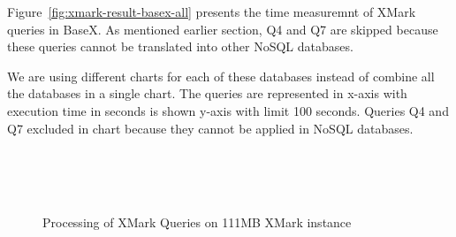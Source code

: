 Figure~\ref{fig:xmark-result-basex-all} presents the time measuremnt of  XMark queries in BaseX. As mentioned earlier section, Q4 and Q7 are skipped because these queries cannot be translated into other NoSQL databases.  
	
We are using different charts for each of these databases instead of combine all the databases in a single chart. The queries are represented in x-axis with execution time in seconds is shown y-axis with limit 100 seconds. Queries Q4 and Q7 excluded in chart because they cannot be applied in NoSQL databases.


\begin{figure}[H]
	\centering
	\\
	
	\centering
	\\
	
	\centering
	\\
	
	\centering
	
	
	\caption{Processing of XMark Queries on 111MB XMark instance}
	\label{fig:xmark-result-1-all}
\end{figure}
